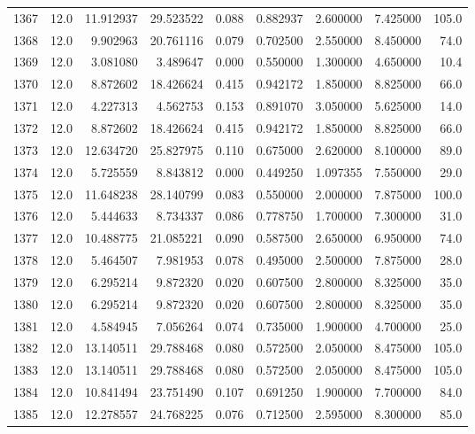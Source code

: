 \begin{tabular}{lrrrrrrrr}
1367 &   12.0 &  11.912937 &  29.523522 &  0.088 &  0.882937 &  2.600000 &   7.425000 &  105.0 \\
1368 &   12.0 &   9.902963 &  20.761116 &  0.079 &  0.702500 &  2.550000 &   8.450000 &   74.0 \\
1369 &   12.0 &   3.081080 &   3.489647 &  0.000 &  0.550000 &  1.300000 &   4.650000 &   10.4 \\
1370 &   12.0 &   8.872602 &  18.426624 &  0.415 &  0.942172 &  1.850000 &   8.825000 &   66.0 \\
1371 &   12.0 &   4.227313 &   4.562753 &  0.153 &  0.891070 &  3.050000 &   5.625000 &   14.0 \\
1372 &   12.0 &   8.872602 &  18.426624 &  0.415 &  0.942172 &  1.850000 &   8.825000 &   66.0 \\
1373 &   12.0 &  12.634720 &  25.827975 &  0.110 &  0.675000 &  2.620000 &   8.100000 &   89.0 \\
1374 &   12.0 &   5.725559 &   8.843812 &  0.000 &  0.449250 &  1.097355 &   7.550000 &   29.0 \\
1375 &   12.0 &  11.648238 &  28.140799 &  0.083 &  0.550000 &  2.000000 &   7.875000 &  100.0 \\
1376 &   12.0 &   5.444633 &   8.734337 &  0.086 &  0.778750 &  1.700000 &   7.300000 &   31.0 \\
1377 &   12.0 &  10.488775 &  21.085221 &  0.090 &  0.587500 &  2.650000 &   6.950000 &   74.0 \\
1378 &   12.0 &   5.464507 &   7.981953 &  0.078 &  0.495000 &  2.500000 &   7.875000 &   28.0 \\
1379 &   12.0 &   6.295214 &   9.872320 &  0.020 &  0.607500 &  2.800000 &   8.325000 &   35.0 \\
1380 &   12.0 &   6.295214 &   9.872320 &  0.020 &  0.607500 &  2.800000 &   8.325000 &   35.0 \\
1381 &   12.0 &   4.584945 &   7.056264 &  0.074 &  0.735000 &  1.900000 &   4.700000 &   25.0 \\
1382 &   12.0 &  13.140511 &  29.788468 &  0.080 &  0.572500 &  2.050000 &   8.475000 &  105.0 \\
1383 &   12.0 &  13.140511 &  29.788468 &  0.080 &  0.572500 &  2.050000 &   8.475000 &  105.0 \\
1384 &   12.0 &  10.841494 &  23.751490 &  0.107 &  0.691250 &  1.900000 &   7.700000 &   84.0 \\
1385 &   12.0 &  12.278557 &  24.768225 &  0.076 &  0.712500 &  2.595000 &   8.300000 &   85.0 \\

\end{tabular}
